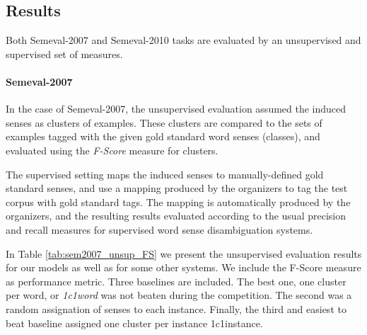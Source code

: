 %



\subsection{Results}
Both Semeval-2007 and Semeval-2010 tasks are evaluated by an unsupervised and supervised set of measures. 
\paragraph{Semeval-2007}
In the case of Semeval-2007, the unsupervised evaluation assumed the induced senses as clusters of examples. These clusters are compared to the sets of examples tagged with the given gold standard word senses (classes), and evaluated using the \textit{F-Score} measure for clusters. 
 
The supervised setting maps the induced senses to manually-defined gold standard senses, and use a mapping produced by the organizers to tag the test corpus with gold standard tags. The mapping is
automatically produced by the organizers, and the resulting results evaluated according to the
usual precision and recall measures for supervised word sense disambiguation systems. 


In Table \ref{tab:sem2007_unsup_FS} we present the unsupervised evaluation results for our models as well as for some other systems. We include the F-Score measure as performance metric. Three baselines are included. The best one, one cluster per word, or \textit{1c1word} was not beaten during the competition. The second was a random assignation of senses to each instance. Finally, the third and easiest to beat baseline assigned one cluster per instance {1c1instance}. 

